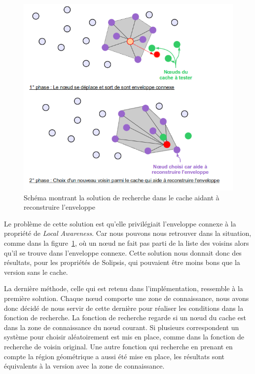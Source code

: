 	\begin{figure}[!h]
        \centering
        \includegraphics[scale=0.45]{./Ressources/Images/cacheReconstructEnvelop.png}
        \caption{Schéma montrant la solution de recherche dans le cache aidant à reconstruire l'enveloppe}
        \label{schemaEnvelopCache}
        \end{figure}
Le problème de cette solution est qu'elle privilégiait l'enveloppe connexe à la propriété de \textit{Local Awareness}. Car nous pouvons nous retrouver dans la situation, comme dans la figure~\ref{schemaEnvelopCache}, où un nœud ne fait pas parti de la liste des voisins alors qu'il se trouve dans l'enveloppe connexe. Cette solution nous donnait donc des résultats, pour les propriétés de Solipsis, qui pouvaient être moins bons que la version sans le cache.  

\par La dernière méthode, celle qui est retenu dans l'implémentation, ressemble à la première solution. Chaque nœud comporte une zone de connaissance, nous avons donc décidé de nous servir de cette dernière pour réaliser les conditions dans la fonction de recherche. La fonction de recherche regarde si un nœud du cache est dans la zone de connaissance du nœud courant. Si plusieurs correspondent un système pour choisir aléatoirement est mis en place, comme dans la fonction de recherche de voisin original. Une autre fonction qui recherche en prenant en compte la région géométrique a aussi été mise en place, les résultats sont équivalents à la version avec la zone de connaissance.

